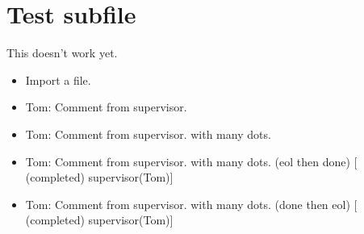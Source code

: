 \chapter{Test subfile}
\label{autosec:10}
This doesn't work yet.
    \begin{itemize}[noitemsep]
        \item {\color{red}Import a file.}
        \item {\color{WildStrawberry}Tom: Comment from supervisor.}
        \item {\color{WildStrawberry}Tom: Comment from supervisor. with many dots.}
        \item {\color{Gray}Tom: Comment from supervisor. with many dots. (eol then done) [ (completed) supervisor(Tom)]}
        \item {\color{Gray}Tom: Comment from supervisor. with many dots. (done then eol) [ (completed) supervisor(Tom)]}
    \end{itemize}


